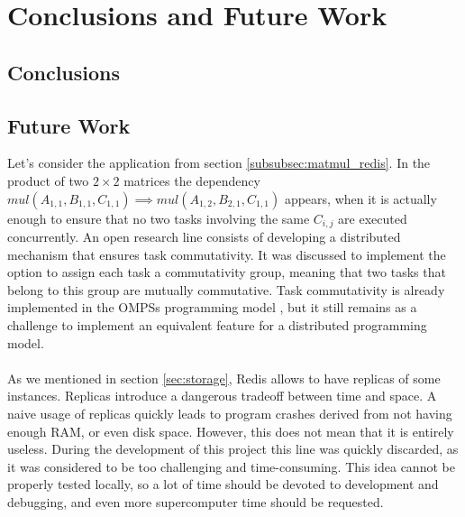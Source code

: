 \section{Conclusions and Future Work}
\subsection{Conclusions}
\label{subsec:conclusions}


\subsection{Future Work}
\label{subsec:future_work}

Let's consider the application from section \ref{subsubsec:matmul_redis}. In the product of two $2 \times 2$ matrices the dependency $mul(A_{1, 1}, B_{1, 1}, C_{1, 1}) \implies mul(A_{1,2}, B_{2, 1}, C_{1, 1})$ appears, when it is actually enough to ensure that no two tasks involving the same $C_{i, j}$ are executed concurrently. An open research line consists of developing a distributed mechanism that ensures task commutativity. It was discussed to implement the option to assign each task a commutativity group, meaning that two tasks that belong to this group are mutually commutative. Task commutativity is already implemented in the OMPSs programming model \cite{duran2011ompss}, but it still remains as a challenge to implement an equivalent feature for a distributed programming model.\\
\\
As we mentioned in section \ref{sec:storage}, Redis allows to have replicas of some instances. Replicas introduce a dangerous tradeoff between time and space. A naive usage of replicas quickly leads to program crashes derived from not having enough RAM, or even disk space. However, this does not mean that it is entirely useless. During the development of this project this line was quickly discarded, as it was considered to be too challenging and time-consuming. This idea cannot be properly tested locally, so a lot of time should be devoted to development and debugging, and even more supercomputer time should be requested.


